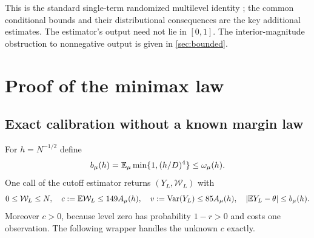 This is the standard single-term randomized multilevel identity
\cite{vihola}; the common conditional bounds and their distributional
consequences are the key additional estimates. The estimator's output need
not lie in $[0,1]$. The interior-magnitude obstruction to nonnegative output is
given in \cref{sec:bounded}.

\section{Proof of the minimax law}\label{sec:minimax-proof}
\subsection{Exact calibration without a known margin law}
For $h=N^{-1/2}$ define
\begin{equation}\label{eq:bias-functional}
 b_\mu(h)=\mathbb E_\mu\min\{1,(h/D)^4\}\le\omega_\mu(h).
\end{equation}
One call of the cutoff estimator returns $(Y_L,\mathcal W_L)$ with
\begin{equation}\label{eq:one-call}
 0\le\mathcal W_L\le N,\quad c:=\mathbb E\mathcal W_L\le149A_\mu(h),\quad
 v:=\operatorname{Var}(Y_L)\le85A_\mu(h),\quad |\mathbb E Y_L-\theta|\le b_\mu(h).
\end{equation}
Moreover $c>0$, because level zero has probability $1-r>0$ and costs one
observation. The following wrapper handles the unknown $c$ exactly.

